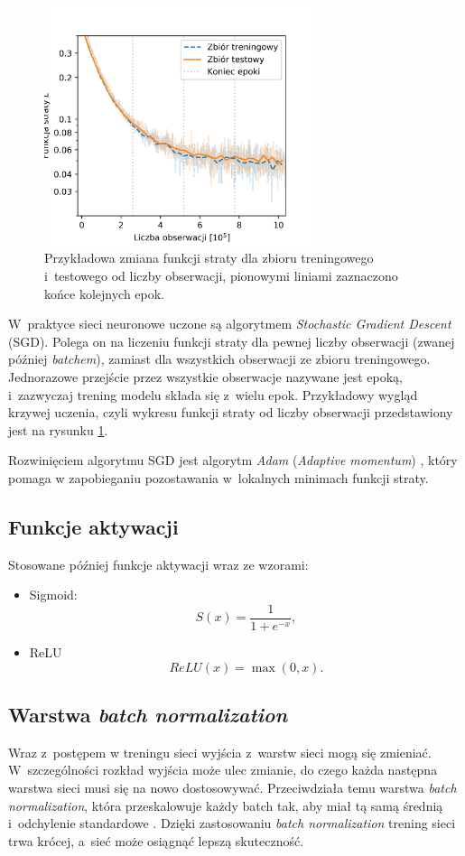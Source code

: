 \documentclass{pracalicmgr}
\begin{document}
	\begin{figure}
	\centering
	\includegraphics[width=0.7\textwidth]{loss_ensemble.png}
	\caption{Przykładowa zmiana funkcji straty dla zbioru treningowego i~testowego od liczby obserwacji, pionowymi liniami zaznaczono końce kolejnych epok.}
	\label{fig:loss_example}
	\end{figure}	
	
	W~praktyce sieci neuronowe uczone są algorytmem \textit{Stochastic Gradient Descent} (SGD). Polega on na liczeniu funkcji straty dla pewnej liczby obserwacji (zwanej później \textit{batchem}), zamiast dla wszystkich obserwacji ze zbioru treningowego. Jednorazowe przejście przez wszystkie obserwacje nazywane jest epoką, i~zazwyczaj trening modelu składa się z~wielu epok. Przykładowy wygląd krzywej uczenia, czyli wykresu funkcji straty od liczby obserwacji przedstawiony jest na rysunku \ref{fig:loss_example}.
	
	Rozwinięciem algorytmu SGD jest algorytm \textit{Adam} (\textit{Adaptive momentum}) \cite{adam}, który pomaga w zapobieganiu pozostawania w~lokalnych minimach funkcji straty.
	
	\subsection{Funkcje aktywacji}
	Stosowane później funkcje aktywacji wraz ze wzorami:
	\begin{itemize}
	\item Sigmoid: $$S(x) = \frac{1}{1+e^{-x}},$$
	\item ReLU\cite{relu} $$ReLU(x) = \max(0, x).$$
	\end{itemize}
	
	\subsection{Warstwa \textit{batch normalization}}
	Wraz z~postępem w treningu sieci wyjścia z~warstw sieci mogą się zmieniać. W~szczególności rozkład wyjścia może ulec zmianie, do czego każda następna warstwa sieci musi się na nowo dostosowywać. Przeciwdziała temu warstwa \textit{batch normalization}, która przeskalowuje każdy batch tak, aby miał tą samą średnią i~odchylenie standardowe \cite{batch_norm}. Dzięki zastosowaniu \textit{batch normalization} trening sieci trwa krócej, a~sieć może osiągnąć lepszą skuteczność.
	
\end{document}
